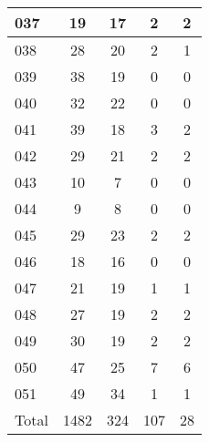 \begin{center}
\begin{longtable}{l|c|c|c|c}
037 & 19 & 17 & 2 & 2\\ \hline
038 & 28 & 20 & 2 & 1\\ \hline
039 & 38 & 19 & 0 & 0\\ \hline
040 & 32 & 22 & 0 & 0\\ \hline
041 & 39 & 18 & 3 & 2\\ \hline
042 & 29 & 21 & 2 & 2\\ \hline
043 & 10 & 7 & 0 & 0\\ \hline
044 & 9 & 8 & 0 & 0\\ \hline
045 & 29 & 23 & 2 & 2\\ \hline
046 & 18 & 16 & 0 & 0\\ \hline
047 & 21 & 19 & 1 & 1\\ \hline
048 & 27 & 19 & 2 & 2\\ \hline
049 & 30 & 19 & 2 & 2\\ \hline
050 & 47 & 25 & 7 & 6\\ \hline
051 & 49 & 34 & 1 & 1\\ \hline
\hline \hline
Total & 1482 & 324 & 107 & 28



\end{longtable}
\end{center}
 
 



\scriptsize



